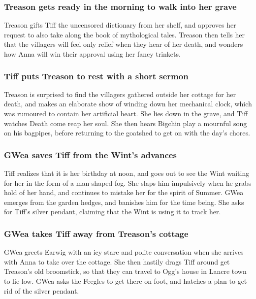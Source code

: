 \subsubsection{\Gls{Treason} gets ready in the morning to walk into her grave}
\Gls{Treason} gifts \Gls{Tiff} the uncensored dictionary from her shelf, and approves her request to
also take along the book of mythological tales. \Gls{Treason} then tells her that the villagers will
feel only relief when they hear of her death, and wonders how \Gls{Anna} will win their approval
using her fancy trinkets.

\subsubsection{\Gls{Tiff} puts \Gls{Treason} to rest with a short sermon}
\Gls{Treason} is surprised to find the villagers gathered outside her cottage for her death, and
makes an elaborate show of winding down her mechanical clock, which was rumoured to contain her
artificial heart. She lies down in the grave, and \Gls{Tiff} watches \Gls{Death} come reap her soul.
She then hears \Gls{Bigchin} play a mournful song on his bagpipes, before returning to the goatshed
to get on with the day's chores.

\subsubsection{\Gls{GWea} saves \Gls{Tiff} from the \Gls{Wint}'s advances}
\Gls{Tiff} realizes that it is her birthday at noon, and goes out to see the \Gls{Wint} waiting
for her in the form of a man-shaped fog. She slaps him impulsively when he grabs hold of her hand,
and continues to mistake her for the spirit of Summer. \Gls{GWea} emerges from the garden hedges,
and banishes him for the time being. She asks for \Gls{Tiff}'s silver pendant, claiming that the
\Gls{Wint} is using it to track her.

\subsubsection{\Gls{GWea} takes \Gls{Tiff} away from \Gls{Treason}'s cottage}
\Gls{GWea} greets \Gls{Earwig} with an icy stare and polite conversation when she arrives with
\Gls{Anna} to take over the cottage. She then hastily drags \Gls{Tiff} around get \Gls{Treason}'s
old broomstick, so that they can travel to \Gls{Ogg}'s house in Lancre town to lie low. \Gls{GWea}
asks the Feegles to get there on foot, and hatches a plan to get rid of the silver pendant.

